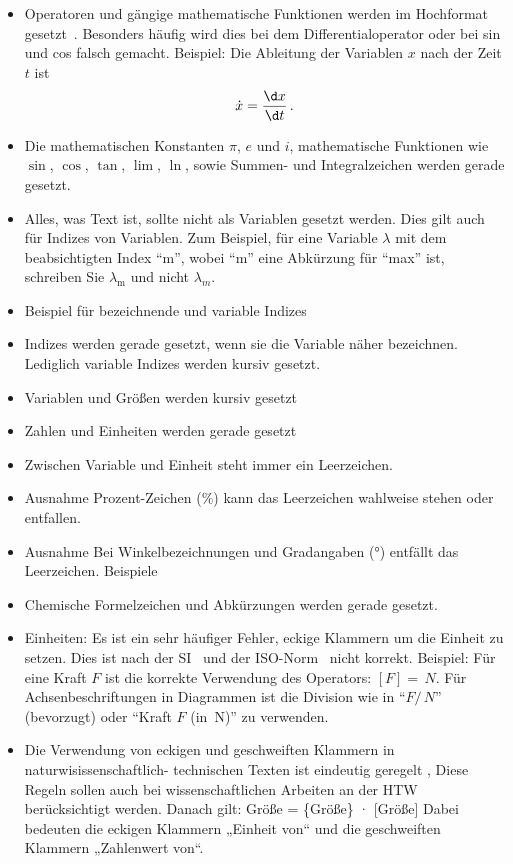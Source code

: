 \begin{itemize}

\item Operatoren und gängige mathematische Funktionen werden im Hochformat gesetzt~\cite{RedBook2010}. Besonders häufig wird dies bei dem Differentialoperator oder bei sin und cos falsch gemacht. Beispiel: Die Ableitung der Variablen $x$ nach der Zeit $t$ ist
\begin{equation}
\dot{x}=\frac{\d x}{\d t} \, .
\label{eq:derivative}
\end{equation}
\item Die mathematischen Konstanten $\pi$, $e$ und $i$, mathematische Funktionen wie $\sin$, $\cos$, $\tan$, $\lim$, $\ln$, sowie Summen- und Integralzeichen werden gerade gesetzt.

\item Alles, was Text ist, sollte nicht als Variablen gesetzt werden. Dies gilt auch für Indizes von Variablen. Zum Beispiel, für eine Variable $\lambda$ mit dem beabsichtigten Index ``m'', wobei ``m'' eine Abkürzung für ``max'' ist, schreiben Sie $\lambda_{\mathrm{m}}$ und nicht $\lambda_m$.
\item Beispiel für bezeichnende und variable Indizes
\item Indizes werden gerade gesetzt, wenn sie die Variable näher bezeichnen. Lediglich variable Indizes werden kursiv gesetzt.
    \item Variablen und Größen werden kursiv gesetzt
\item Zahlen und Einheiten werden gerade gesetzt
\item Zwischen Variable und Einheit steht immer ein Leerzeichen. 
\item Ausnahme Prozent-Zeichen (\%) kann das Leerzeichen wahlweise stehen oder entfallen.
\item Ausnahme Bei Winkelbezeichnungen und Gradangaben (°) entfällt das Leerzeichen.
Beispiele

\item Chemische Formelzeichen und Abkürzungen werden gerade gesetzt.
\item Einheiten: Es ist ein sehr häufiger Fehler, eckige Klammern um die Einheit zu setzen. Dies ist nach der SI~\cite{SIbrochure2006} und der ISO-Norm~\cite{ISOnormunits} nicht korrekt. Beispiel: Für eine Kraft $F$ ist die korrekte Verwendung des Operators: $[F]=\,{N}$. Für Achsenbeschriftungen in Diagrammen ist die Division wie in ``$F/\,{N}$'' (bevorzugt) oder ``Kraft $F$ (in \,{N})'' zu verwenden. %
\item Die Verwendung von eckigen und geschweiften Klammern in naturwisissenschaftlich- technischen  Texten ist eindeutig geregelt \cite{ISOnormunits}\cite{DINFormelsatz}\cite{DINFormelzeichen}, Diese Regeln sollen auch bei wissenschaftlichen Arbeiten an der HTW berücksichtigt werden. Danach gilt:
Größe = \{Größe\} · [Größe]
Dabei bedeuten die eckigen Klammern „Einheit von“ und die geschweiften Klammern
„Zahlenwert von“.


\end{itemize}

